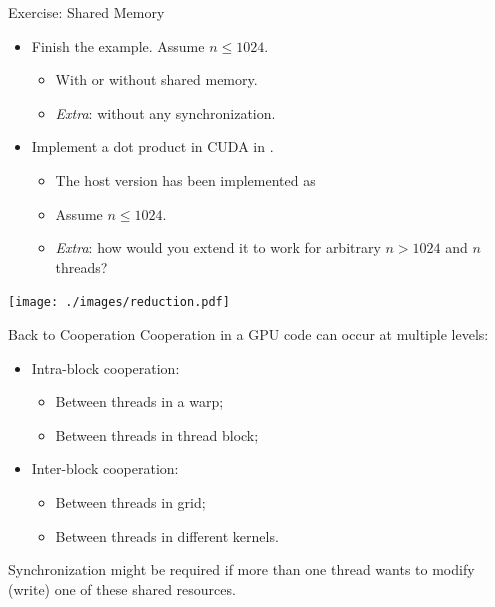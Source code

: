 \documentclass[aspectratio=43]{beamer}
\begin{document}
\begin{frame}[fragile]{Exercise: Shared Memory}
    \begin{itemize}
        \item Finish the  example. Assume $n\leq1024$.
        \begin{itemize}
            \item With or without shared memory.
            \item \emph{Extra}: without any synchronization.
        \end{itemize}
        \item Implement a dot product in CUDA in .
        \begin{itemize}
            \item The host version has been implemented as 
            \item Assume $n\leq1024$.
            \item \emph{Extra}: how would you extend it to work for arbitrary $n>1024$ and $n$ threads?
        \end{itemize}
    \end{itemize}

    \centering \texttt{[image: ./images/reduction.pdf]}

\end{frame}

\begin{frame}[fragile]{Back to Cooperation}
    Cooperation in a GPU code can occur at multiple levels:
    \begin{itemize}
        \item Intra-block cooperation:
        \begin{itemize}
            \item Between threads in a warp;
            \item Between threads in thread block;
        \end{itemize}
        \item Inter-block cooperation:
        \begin{itemize}
            \item Between threads in grid;
            \item Between threads in different kernels.\\
        \end{itemize}
    \end{itemize}
    \bigskip
    Synchronization might be required if more than one thread wants to modify (write) one of these shared resources.
\end{frame}
\end{document}
